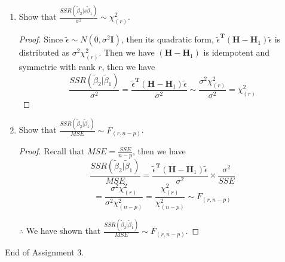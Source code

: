 \documentclass[12pt]{article}
\newcommand{\ytilde}{\tilde{y}}
\newcommand{\X}{\mathbf{X}}
\newcommand{\btilde}{\tilde{\beta}}
\newcommand{\etilde}{\tilde{\epsilon}}
\newcommand{\xtxinv}{(\X^{\T}\X)^{-1}}
\newcommand{\I}{\mathbf{I}}
\newcommand{\T}{\mathbf{T}}
\newcommand{\HM}{\mathbf{H}}
\begin{document}
\begin{enumerate}[1.]
\begin{enumerate}
                \begin{proof}
                    Recall that $\HM = \X \xtxinv \X^\T$, $\HM_1 = \X_1 \xtxinv_1 \X_1^\T$ 
                    and that $(\HM - \HM_1)$ is idempotent and symmetric with rank $r$.
                    Then we have
                    \begin{align*}
                        SSR(\btilde_2 | \btilde_1) &= \hat{\btilde}^\T \X^\T \ytilde - \hat{\btilde}_1^\T \X_1^\T \ytilde \\
                        &= \etilde^\T \X \xtxinv \X^\T \etilde - \etilde^\T \X_1 \xtxinv_1 \X_1^\T \etilde \\
                        &= \etilde^\T (\X \xtxinv \X^\T - \X_1 \xtxinv_1 \X_1^\T) \etilde \\
                        &= \etilde^\T (\HM - \HM_1) \etilde
                    \end{align*}
                    $\therefore$ We have shown that $SSR(\btilde_2 | \btilde_1) =  \etilde^\T (\HM - \HM_1) \etilde$.
                \end{proof}
                \item Show that $\frac{SSR(\btilde_2 | s\btilde_1)}{\sigma^2} \sim \chi^2_{(r)}$.
                \begin{proof}
                    Since $\etilde \sim N(0, \sigma^2 \I)$, then its quadratic form, $\etilde^\T (\HM - \HM_1) \etilde$ is distributed as $\sigma^2 \chi^2_{(r)}$.
                    Then we have $(\HM - \HM_1)$ is idempotent and symmetric with rank $r$, then we have
                \[ \frac{SSR(\btilde_2 | \btilde_1)}{\sigma^2} = 
                \frac{\etilde^\T (\HM - \HM_1) \etilde}{\sigma^2} \sim \frac{\sigma^2 \chi^2_{(r)}}{\sigma^2} = \chi^2_{(r)}\]
                \end{proof}
                \item Show that $\frac{SSR(\btilde_2 | \btilde_1)}{MSE} \sim F_{(r, n - p)}$.
                \begin{proof}
                    Recall that $MSE = \frac{SSE}{n - p}$, then we have
                    \[ \frac{SSR(\btilde_2 | \btilde_1)}{MSE} = \frac{\etilde^\T (\HM - \HM_1) \etilde}{\sigma^2} \times \frac{\sigma^2}{SSE} \]
                    \[= \frac{\sigma^2 \chi^2_{(r)}}{\sigma^2 \chi^2_{(n - p)}} = \frac{\chi^2_{(r)}}{\chi^2_{(n - p)}} \sim  F_{(r, n - p)}\]

                    $\therefore$ We have shown that $\frac{SSR(\btilde_2 | \btilde_1)}{MSE} \sim  F_{(r, n - p)}$.
                \end{proof}
            \end{enumerate}
                
                
                 
    \end{enumerate}
End of Assignment 3.
\end{document}

